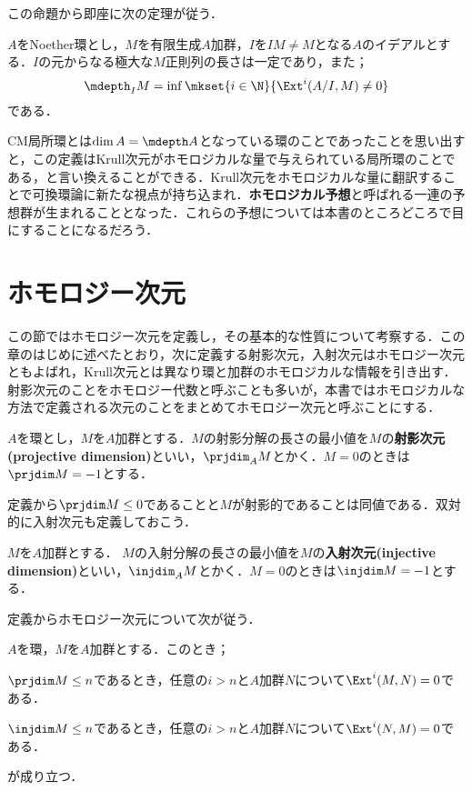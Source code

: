 この命題から即座に次の定理が従う．
\begin{thm}[Rees]\label{thm:Extとdepth}
	$A$をNoether環とし，$M$を有限生成$A$加群，$I$を$IM\neq M$となる$A$のイデアルとする．$I$の元からなる極大な$M$正則列の長さは一定であり，また；
	\[\mdepth_I M=\inf\mkset{i\in\N}{\Ext^i(A/I,M)\neq0}\]
	である．
\end{thm}

CM局所環とは$\dim A=\mdepth A$となっている環のことであったことを思い出すと，この定義はKrull次元がホモロジカルな量で与えられている局所環のことである，と言い換えることができる．Krull次元をホモロジカルな量に翻訳することで可換環論に新たな視点が持ち込まれ．\textbf{ホモロジカル予想}と呼ばれる一連の予想群が生まれることとなった．これらの予想については本書のところどころで目にすることになるだろう．

\section{ホモロジー次元}

この節ではホモロジー次元を定義し，その基本的な性質について考察する．この章のはじめに述べたとおり，次に定義する射影次元，入射次元はホモロジー次元ともよばれ，Krull次元とは異なり環と加群のホモロジカルな情報を引き出す．射影次元のことをホモロジー代数と呼ぶことも多いが，本書ではホモロジカルな方法で定義される次元のことをまとめてホモロジー次元と呼ぶことにする．

\begin{defi}[射影次元]
	$A$を環とし，$M$を$A$加群とする．$M$の射影分解の長さの最小値を$M$の\textbf{射影次元(projective dimension)}といい，$\prjdim_A M$とかく．$M=0$のときは$\prjdim M=-1$とする．
\end{defi}

定義から$\prjdim M\leq 0$であることと$M$が射影的であることは同値である．双対的に入射次元も定義しておこう．

\begin{defi}[入射次元]
	$M$を$A$加群とする． $M$の入射分解の長さの最小値を$M$の\textbf{入射次元(injective dimension)}といい，$\injdim_A M$とかく．$M=0$のときは$\injdim M=-1$とする．
\end{defi}

定義からホモロジー次元について次が従う．

\begin{lem}
	$A$を環，$M$を$A$加群とする．このとき；
	\begin{sakura}
		\item $\prjdim M\leq n$であるとき，任意の$i>n$と$A$加群$N$について$\Ext^{i}(M,N)=0$である．
		\item $\injdim M\leq n$であるとき，任意の$i>n$と$A$加群$N$について$\Ext^{i}(N,M)=0$である．
	\end{sakura}
	が成り立つ．
\end{lem}

